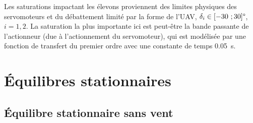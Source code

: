     Les saturations impactant les élevons proviennent des limites physiques des servomoteurs et du débattement limité par la forme de l'UAV, $\delta_i \in [-30~; 30]\text{\textdegree}$, $i=1,2$. La saturation la plus importante ici est peut-être la bande passante de l'actionneur (due à l'actionnement du servomoteur), qui est modélisée par une fonction de transfert du premier ordre avec une constante de temps \SI{0,05}{\second}. 

\section{Équilibres stationnaires}
    \subsection{Équilibre stationnaire sans vent}
    \label{sec:eq_nowind}

